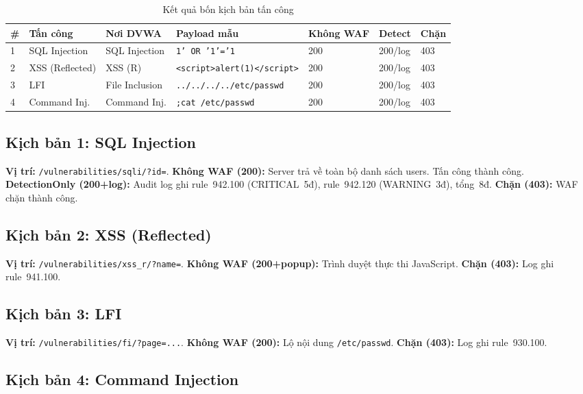 \documentclass[12pt,a4paper,twoside]{report}
\begin{document}
\begin{table}[H]
\centering
\caption{Kết quả bốn kịch bản tấn công}
\label{tab:main_results}
\begin{tabular}{C{0.6cm}L{2cm}L{2.5cm}L{2.5cm}C{1.5cm}C{1.5cm}C{1.5cm}}
\toprule
\textbf{\#} & \textbf{Tấn công} & \textbf{Nơi DVWA} & \textbf{Payload mẫu} & \textbf{Không WAF} & \textbf{Detect} & \textbf{Chặn} \\
 & SQL Injection & SQL Injection & \texttt{1' OR '1'='1} & 200 & 200/log & 403 \\
2 & XSS (Reflected)& XSS (R) & \texttt{<script>alert(1)</script>} & 200 & 200/log & 403 \\
3 & LFI & File Inclusion & \texttt{../../../../etc/passwd} & 200 & 200/log & 403 \\
4 & Command Inj. & Command Inj. & \texttt{;cat /etc/passwd} & 200 & 200/log & 403 \\
\bottomrule
\end{tabular}
\end{table}

\subsection{Kịch bản 1: SQL Injection}

\textbf{Vị trí:} \texttt{/vulnerabilities/sqli/?id=}. \textbf{Không WAF (200):} Server trả về toàn bộ danh sách users. Tấn công thành công. \textbf{DetectionOnly (200+log):} Audit log ghi rule~942.100 (CRITICAL~5đ), rule~942.120 (WARNING~3đ), tổng~8đ. \textbf{Chặn (403):} WAF chặn thành công.

\subsection{Kịch bản 2: XSS (Reflected)}

\textbf{Vị trí:} \texttt{/vulnerabilities/xss\_r/?name=}. \textbf{Không WAF (200+popup):} Trình duyệt thực thi JavaScript. \textbf{Chặn (403):} Log ghi rule~941.100.

\subsection{Kịch bản 3: LFI}

\textbf{Vị trí:} \texttt{/vulnerabilities/fi/?page=...}. \textbf{Không WAF (200):} Lộ nội dung \texttt{/etc/passwd}. \textbf{Chặn (403):} Log ghi rule~930.100.

\subsection{Kịch bản 4: Command Injection}
\end{document}
